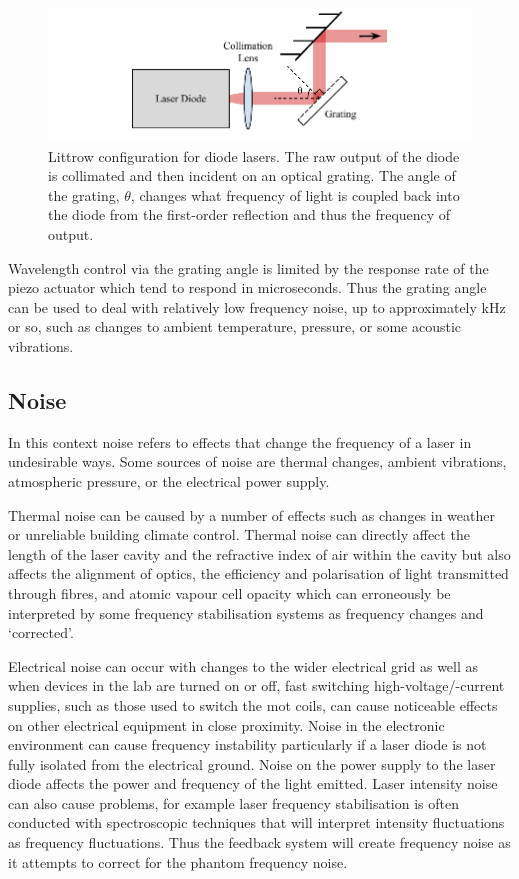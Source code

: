 \begin{figure}
\includegraphics{part1/Figs/LittrowConfiguration.pdf}
\caption[Littrow configuration diode laser.]{Littrow configuration for diode lasers. The raw output of the diode is collimated and then incident on an optical grating. The angle of the grating, $\theta$, changes what frequency of light is coupled back into the diode from the first-order reflection and thus the frequency of output.}
\label{figure:littrow}
\end{figure}

Wavelength control via the grating angle is limited by the response rate of the piezo actuator which tend to respond in microseconds.
Thus the grating angle can be used to deal with relatively low frequency noise, up to approximately \unit[1]{kHz} or so, such as changes to ambient temperature, pressure, or some acoustic vibrations.

\subsection{Noise}
In this context noise refers to effects that change the frequency of a laser in undesirable ways.
Some sources of noise are thermal changes, ambient vibrations, atmospheric pressure, or the electrical power supply.

Thermal noise can be caused by a number of effects such as changes in weather or unreliable building climate control.
Thermal noise can directly affect the length of the laser cavity and the refractive index of air within the cavity but also affects the alignment of optics, the efficiency and polarisation of light transmitted through fibres, and atomic vapour cell opacity which can erroneously be interpreted by some frequency stabilisation systems as frequency changes and `corrected'.

Electrical noise can occur with changes to the wider electrical grid as well as when devices in the lab are turned on or off, fast switching high-voltage/-current supplies, such as those used to switch the \gls{mot} coils, can cause noticeable effects on other electrical equipment in close proximity.
Noise in the electronic environment can cause frequency instability particularly if a laser diode is not fully isolated from the electrical ground.
Noise on the power supply to the laser diode affects the power and frequency of the light emitted.
Laser intensity noise can also cause problems, for example laser frequency stabilisation is often conducted with spectroscopic techniques that will interpret intensity fluctuations as frequency fluctuations. Thus the feedback system will create frequency noise as it attempts to correct for the phantom frequency noise.

